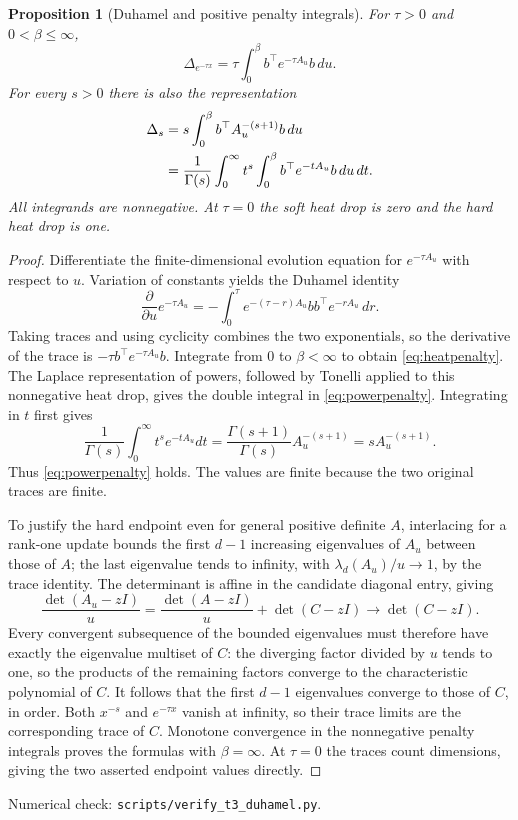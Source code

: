 \documentclass[11pt]{article}
\newtheorem{proposition}[theorem]{Proposition}
\begin{document}
\begin{proposition}[Duhamel and positive penalty integrals]\label{prop:duhamel}
For $\tau>0$ and $0<\beta\leq\infty$,
\begin{equation}\label{eq:heatpenalty}
 \Delta_{e^{-\tau x}}=\tau\int_0^\beta
                b^\top e^{-\tau A_u}b\,du.
\end{equation}
For every $s>0$ there is also the representation
\begin{align}
 \Delta_s
 &=s\int_0^\beta b^\top A_u^{-(s+1)}b\,du\label{eq:powerpenalty}\\
 &=\frac1{\Gamma(s)}\int_0^\infty t^s
                \int_0^\beta b^\top e^{-tA_u}b\,du\,dt.\notag
\end{align}
All integrands are nonnegative. At $\tau=0$ the soft heat drop is zero
and the hard heat drop is one.
\end{proposition}
\begin{proof}
Differentiate the finite-dimensional evolution equation for
$e^{-\tau A_u}$ with respect to $u$. Variation of constants yields
the Duhamel identity
\[
 \frac{\partial}{\partial u}e^{-\tau A_u}
 =-\int_0^\tau e^{-(\tau-r)A_u}bb^\top e^{-rA_u}\,dr.
\]
Taking traces and using cyclicity combines the two exponentials,
so the derivative of the trace is $-\tau b^\top e^{-\tau A_u}b$.
Integrate from $0$ to $\beta<\infty$ to obtain \eqref{eq:heatpenalty}.
The Laplace representation of powers, followed by Tonelli applied
to this nonnegative heat drop, gives the double integral in
\eqref{eq:powerpenalty}. Integrating in $t$ first gives
\[
 \frac1{\Gamma(s)}\int_0^\infty t^s e^{-tA_u}dt
 =\frac{\Gamma(s+1)}{\Gamma(s)}A_u^{-(s+1)}
 =sA_u^{-(s+1)}.
\]
Thus \eqref{eq:powerpenalty} holds. The values are finite because
the two original traces are finite.

To justify the hard endpoint even for general positive definite $A$,
interlacing for a rank-one update bounds the first $d-1$ increasing
eigenvalues of $A_u$ between those of $A$; the last eigenvalue tends
to infinity, with $\lambda_d(A_u)/u\to1$, by the trace identity.
The determinant is affine in the candidate diagonal entry, giving
\[
 \frac{\det(A_u-zI)}{u}
 =\frac{\det(A-zI)}{u}+\det(C-zI)\longrightarrow\det(C-zI).
\]
Every convergent subsequence of the bounded eigenvalues must
therefore have exactly the eigenvalue multiset of $C$: the diverging
factor divided by $u$ tends to one, so the products of the remaining
factors converge to the characteristic polynomial of $C$.
It follows that the first $d-1$ eigenvalues converge to those of
$C$, in order. Both $x^{-s}$ and $e^{-\tau x}$ vanish at infinity,
so their trace limits are the corresponding trace of $C$.
Monotone convergence in the nonnegative penalty integrals proves
the formulas with $\beta=\infty$. At $\tau=0$ the traces count
dimensions, giving the two asserted endpoint values directly.
\end{proof}
\noindent Numerical check: \texttt{scripts/verify\_t3\_duhamel.py}.
\end{document}
